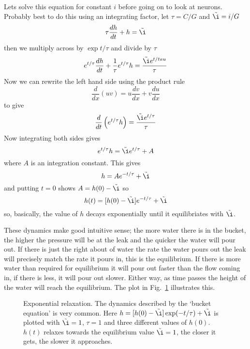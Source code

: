 \documentclass[11pt,a4paper]{scrartcl}
\begin{document}
Lets solve this equation for constant $i$ before going on to look at
neurons. Probably best to do this using an integrating factor, let
$\tau=C/G$ and $\tilde{\i}=i/G$
\begin{equation}
\tau\frac{dh}{dt}+h=\tilde{\i}
\end{equation}
then we multiply across by $\exp{t/\tau}$ and divide by $\tau$
\begin{equation}
e^{t/\tau}\frac{dh}{dt}+\frac{1}{\tau}e^{t/\tau}h=\frac{\tilde{\i}e^{t/tau}}{\tau}
\end{equation}
Now we can rewrite the left hand side using the product rule
\begin{equation}
\frac{d}{dx}(uv)=u\frac{dv}{dx}+v\frac{du}{dx}
\end{equation}
to give
\begin{equation}
\frac{d}{dt}\left(e^{t/\tau}h\right)=\frac{\tilde{\i}e^{t/\tau}}{\tau}
\end{equation}
Now integrating both sides gives
\begin{equation}
e^{t/\tau}h=\tilde{\i}e^{t/\tau}+A
\end{equation}
where $A$ is an integration constant. This gives
\begin{equation}
h=Ae^{-t/\tau}+\tilde{\i}
\end{equation}
and putting $t=0$ shows $A=h(0)-\tilde{\i}$ so
\begin{equation}
h(t)=[h(0)-\tilde{\i}]e^{-t/\tau}+\tilde{\i}
\end{equation}
so, basically, the value of $h$ decays exponentially until it
equilibriates with $\tilde{\i}$.

These dynamics make good intuitive sense; the more water there is in
the bucket, the higher the pressure will be at the leak and the
quicker the water will pour out. If there is just the right about of
water the rate the water pours out the leak will precisely match the
rate it pours in, this is the equilibrium. If there is more water than
required for equilibrium it will pour out faster than the flow coming
in, if there is less, it will pour out slower. Either way, as time
passes the height of the water will reach the equilibrium. The plot in
Fig.~\ref{bucket_v} illustrates this.

\begin{figure}
\begin{center}

\end{center}
\caption{Exponential relaxation. The dynamics described by the
  \lq{}bucket equation\rq{} is very common. Here
  $h=[h(0)-\tilde{\i}]\exp(-t/\tau)+\tilde{\i}$ is plotted with
  $\tilde{\i}=1$, $\tau=1$ and three different values of
  $h(0)$. $h(t)$ relaxes towards the equilibrium value $\tilde{\i}=1$,
  the closer it gets, the slower it approaches.\label{bucket_v}}
\end{figure}
\end{document}
